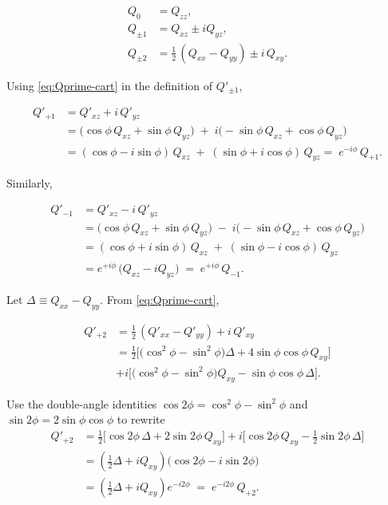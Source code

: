 \begin{equation}
\begin{aligned}
Q_0 &= Q_{zz},\\
Q_{\pm1} &= Q_{xz}\pm iQ_{yz},\\
Q_{\pm2} &= \tfrac12\,(Q_{xx}-Q_{yy}) \pm i\,Q_{xy}.
\end{aligned}
\label{eq:Q-spherical-def}
\end{equation}

Using \ref{eq:Qprime-cart} in the definition of $Q'_{\pm1}$,

\begin{equation}
\begin{aligned}
Q'_{+1}
&= Q'_{xz}+i\,Q'_{yz}\\
&= \big(\cos\phi\,Q_{xz}+\sin\phi\,Q_{yz}\big)\;+\;i\big(-\sin\phi\,Q_{xz}+\cos\phi\,Q_{yz}\big)\\
&= (\cos\phi - i\sin\phi)\,Q_{xz}\;+\;(\sin\phi + i\cos\phi)\,Q_{yz} =\; e^{-i\phi}\,Q_{+1}.
\end{aligned}
\end{equation}

Similarly,

\begin{equation}
\begin{aligned}
Q'_{-1}
&= Q'_{xz}-i\,Q'_{yz}\\
&= \big(\cos\phi\,Q_{xz}+\sin\phi\,Q_{yz}\big)\;-\;i\big(-\sin\phi\,Q_{xz}+\cos\phi\,Q_{yz}\big)\\
&= (\cos\phi + i\sin\phi)\,Q_{xz}\;+\;(\sin\phi - i\cos\phi)\,Q_{yz}\\
&= e^{+i\phi}\,\big(Q_{xz}-iQ_{yz}\big) \;=\; e^{+i\phi}\,Q_{-1}.
\end{aligned}
\end{equation}

Let $\Delta\equiv Q_{xx}-Q_{yy}$. From \eqref{eq:Qprime-cart},

\begin{equation}
\begin{aligned}
Q'_{+2}
&= \tfrac12\,(Q'_{xx}-Q'_{yy}) + i\,Q'_{xy}\\
&= \tfrac12\Big[\big(\cos^2\!\phi-\sin^2\!\phi\big)\Delta + 4\sin\phi\cos\phi\,Q_{xy}\Big]\\
&+ i\Big[\big(\cos^2\!\phi-\sin^2\!\phi\big)Q_{xy} - \sin\phi\cos\phi\,\Delta\Big].
\end{aligned}
\end{equation}

Use the double-angle identities $\cos 2\phi=\cos^2\!\phi-\sin^2\!\phi$ and $\sin 2\phi=2\sin\phi\cos\phi$ to rewrite
\begin{equation}
\begin{aligned}
Q'_{+2}
&= \tfrac12\Big[\cos 2\phi\,\Delta + 2\sin 2\phi\,Q_{xy}\Big]
+ i\Big[\cos 2\phi\,Q_{xy} - \tfrac12\sin 2\phi\,\Delta\Big]\\[4pt]
&= \left(\tfrac12\Delta + iQ_{xy}\right)\big(\cos 2\phi - i\sin 2\phi\big)\\[4pt]
&= \left(\tfrac12\Delta + iQ_{xy}\right) e^{-i2\phi}
\;=\; e^{-i2\phi}\,Q_{+2}.
\end{aligned}
\end{equation}

